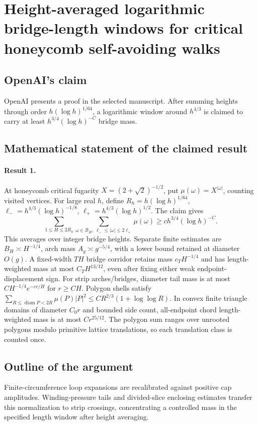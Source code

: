 \documentclass[11pt]{article}
\begin{document}
\section*{Height-averaged logarithmic bridge-length windows for critical honeycomb self-avoiding walks}

\subsection{OpenAI's claim}
OpenAI presents a proof in the selected manuscript. After summing heights through order $h(\log h)^{1/64}$, a logarithmic window around $h^{4/3}$ is claimed to carry at least $h^{3/4}(\log h)^{-C}$ bridge mass.

\subsection{Mathematical statement of the claimed result}
\paragraph{Result 1.} At honeycomb critical fugacity \(X=(2+\sqrt2)^{-1/2}\), put \(\mu(\omega)=X^{|\omega|}\), counting visited vertices. For large real \(h\), define \(R_h=h(\log h)^{1/64}\), \(\ell_-=h^{4/3}(\log h)^{-1/8}\), \(\ell_+=h^{4/3}(\log h)^{1/2}\). The claim gives
\[
 \sum_{1\le H\le2R_h}\sum_{\omega\in\mathcal B_H,\ \ell_-\le|\omega|\le2\ell_+}\mu(\omega)
 \ge c h^{3/4}(\log h)^{-C}.
\]
This averages over integer bridge heights. Separate finite estimates are \(B_H\asymp H^{-1/4}\), arch mass \(A_g\asymp g^{-5/4}\), with a lower bound retained at diameter \(O(g)\). A fixed-width \(TH\) bridge corridor retains mass \(c_TH^{-1/4}\) and has length-weighted mass at most \(C_TH^{13/12}\), even after fixing either weak endpoint-displacement sign. For strip arches/bridges, diameter tail mass is at most \(CH^{-1/4}e^{-cr/H}\) for \(r\ge CH\). Polygon shells satisfy \(\sum_{R\le\operatorname{diam}P<2R}\mu(P)|P|^2\le CR^{2/3}(1+\log\log R)\). In convex finite triangle domains of diameter \(C_0r\) and bounded side count, all-endpoint chord length-weighted mass is at most \(Cr^{25/12}\). The polygon sum ranges over unrooted polygons modulo primitive lattice translations, so each translation class is counted once.

\subsection{Outline of the argument}
Finite-circumference loop expansions are recalibrated against positive cap amplitudes. Winding-pressure tails and divided-slice enclosing estimates transfer this normalization to strip crossings, concentrating a controlled mass in the specified length window after height averaging.
\end{document}
